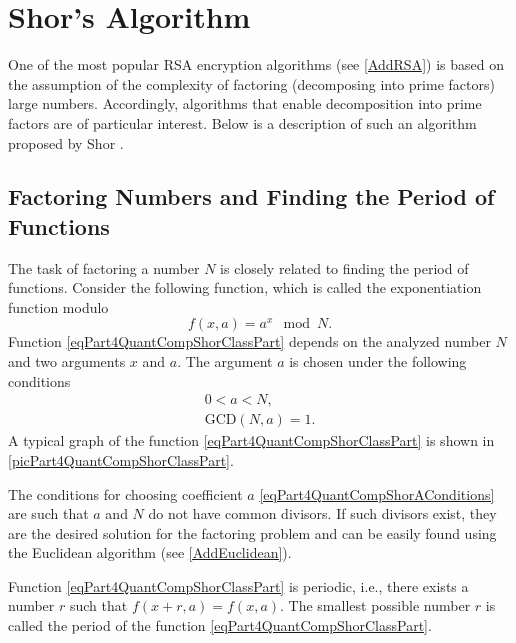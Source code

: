 \section{Shor's Algorithm}
\label{Part4QuantCompShor}
One of the most popular RSA encryption algorithms (see 
\autoref{AddRSA}) 
is based on the assumption of the complexity of factoring
(decomposing into prime factors) large numbers. Accordingly,
algorithms that enable decomposition into prime factors
are of particular interest. Below is a description of such an
algorithm proposed by Shor \cite{bShor94}.

\subsection{Factoring Numbers and Finding the Period of Functions}
\label{sec:part4:algoshor:periodfind}
The task of factoring a number $N$ is closely related to finding the period
of functions. Consider the following function, which is called the exponentiation
function modulo
\begin{equation}
f\left(x, a\right) = a^x \mod N.
\label{eqPart4QuantCompShorClassPart}
\end{equation}
Function \eqref{eqPart4QuantCompShorClassPart} depends on
the analyzed number $N$ and two arguments $x$ and $a$. The argument $a$
is chosen under the following conditions
\begin{eqnarray}
0 < a < N,
\nonumber \\
\mbox{GCD}\left(N, a\right) = 1.
\label{eqPart4QuantCompShorAConditions}
\end{eqnarray}
A typical graph of the function \eqref{eqPart4QuantCompShorClassPart} is shown in
\autoref{picPart4QuantCompShorClassPart}.




The conditions for choosing coefficient $a$
\eqref{eqPart4QuantCompShorAConditions} are such that $a$ and $N$ do not have
common divisors. If such divisors exist, they are
the desired solution for the factoring problem and can be easily found
using the Euclidean algorithm (see \autoref{AddEuclidean}).

Function \eqref{eqPart4QuantCompShorClassPart} is periodic,
i.e., there exists a number $r$ such that $f\left(x + r, a\right) = 
f\left(x, a\right)$. The smallest possible number $r$ is called
the period of the function \eqref{eqPart4QuantCompShorClassPart}. 

